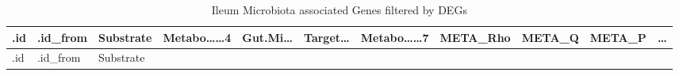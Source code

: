 \documentclass[
]{article}
\begin{document}
\begin{longtable}[]{@{}lllllllllll@{}}
\caption{\label{tab:Ileum-Microbiota-associated-Genes-filtered-by-DEGs}Ileum Microbiota associated Genes filtered by DEGs}\tabularnewline
\toprule
\begin{minipage}[b]{0.03\columnwidth}\raggedright
.id\strut
\end{minipage} & \begin{minipage}[b]{0.07\columnwidth}\raggedright
.id\_from\strut
\end{minipage} & \begin{minipage}[b]{0.07\columnwidth}\raggedright
Substrate\strut
\end{minipage} & \begin{minipage}[b]{0.09\columnwidth}\raggedright
Metabo\ldots\ldots4\strut
\end{minipage} & \begin{minipage}[b]{0.07\columnwidth}\raggedright
Gut.Mi\ldots{}\strut
\end{minipage} & \begin{minipage}[b]{0.07\columnwidth}\raggedright
Target\ldots{}\strut
\end{minipage} & \begin{minipage}[b]{0.09\columnwidth}\raggedright
Metabo\ldots\ldots7\strut
\end{minipage} & \begin{minipage}[b]{0.07\columnwidth}\raggedright
META\_Rho\strut
\end{minipage} & \begin{minipage}[b]{0.07\columnwidth}\raggedright
META\_Q\strut
\end{minipage} & \begin{minipage}[b]{0.07\columnwidth}\raggedright
META\_P\strut
\end{minipage} & \begin{minipage}[b]{0.03\columnwidth}\raggedright
\ldots{}\strut
\end{minipage}\tabularnewline
\midrule
\endfirsthead
\toprule
\begin{minipage}[b]{0.03\columnwidth}\raggedright
.id\strut
\end{minipage} & \begin{minipage}[b]{0.07\columnwidth}\raggedright
.id\_from\strut
\end{minipage} & \begin{minipage}[b]{0.07\columnwidth}\raggedright
Substrate\strut
\end{minipage} & \begin{minipage}[b]{0.09\columnwidth}\raggedright

\end{minipage}
\end{longtable}
\end{document}
